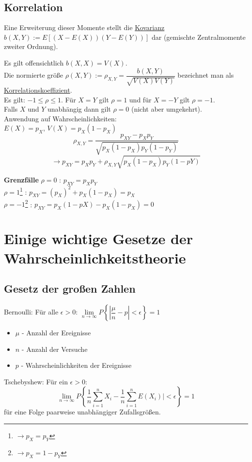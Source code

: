 \subsection{Korrelation}
Eine Erweiterung dieser Momente stellt die \underline{Kovarianz}
$b(X,Y) := E\left[\left(X-E(X)\right) \left( Y-E(Y) \right)\right]$
dar (gemischte Zentralmomente zweiter Ordnung).

Es gilt offensichtlich $b(X,X) = V(X)$.\\
Die normierte größe $\rho(X,Y) := \rho_{X,Y} = \dfrac{b(X,Y)}{\sqrt{V(X)V(Y)}}$ bezeichnet man als \underline{Korrelationskoeffizient}. \\
Es gilt: $-1 \leq \rho \leq 1$. Für $X=Y$ gilt $\rho = 1$ und für $X=-Y$ gilt $\rho = -1$. \\
Falls $X$ und $Y$ unabhängig dann gilt $\rho = 0$ (nicht aber umgekehrt).\\
Anwendung auf Wahrscheinlichkeiten: \\
$E(X) = p_X$, $V(X) = p_X(1 - p_X)$ \\

\[\rho_{X,Y} = \dfrac{p_{XY} - p_Xp_Y}{\sqrt{p_X(1-p_X) p_Y(1-p_Y)}}\]
\[ \rightarrow p_{XY} = p_Xp_Y + \rho_{X,Y} \sqrt{p_X(1-p_X)p_Y(1-pY)}\]

\textbf{Grenzfälle} 
$\rho = 0$ : $p_{XY} = p_X p_Y$\\
$\rho = 1$\footnote{$\rightarrow p_X = p_Y$} : $p_{XY} = (p_X)^2 + p_X(1-p_X) = p_X$\\
$\rho = -1$\footnote{$\rightarrow p_X = 1 - p_Y$} : $p_{XY} = p_X(1-pX) - p_X(1-p_X) = 0 $\\

\section{Einige wichtige Gesetze der Wahrscheinlichkeitstheorie}

\subsection{Gesetz der großen Zahlen}
Bernoulli: Für alle $\epsilon > 0$: $\lim\limits_{n \rightarrow \infty}{P \left\lbrace| \dfrac{\mu}{n} - p | < \epsilon \right\rbrace} = 1$
\begin{itemize}
	\item $\mu$ - Anzahl der Ereignisse
	\item $n$ - Anzahl der Versuche
	\item $p$ - Wahrscheinlichkeiten der Ereignisse
\end{itemize}
Tschebyshew: Für ein $\epsilon >0$:
\[\lim\limits_{n \to \infty} P \left\{\frac{1}{n} \sum_{i=1}^{n} X_i - \frac{1}{n} \sum_{i=1}^{n} E(X_i)| < \epsilon \right\} = 1\] für eine Folge paarweise unabhängiger Zufallsgrößen.\\

